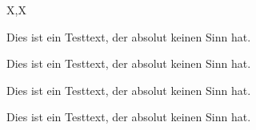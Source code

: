 \documentclass[a3paper,scifiposter,style=scifi]{tubsposter}
\begin{document}
\begin{tubsposter}{X,X}
  \begin{posterrow}[5cm,X]
    \begin{postercol}
      Dies ist ein Testtext, der absolut keinen Sinn hat.
    \end{postercol}
    \begin{postercol}
      Dies ist ein Testtext, der absolut keinen Sinn hat.
    \end{postercol}
  \end{posterrow}
  \begin{posterrow}[5cm,X]
    \begin{postercol}
      Dies ist ein Testtext, der absolut keinen Sinn hat.
    \end{postercol}
    \begin{postercol}
      Dies ist ein Testtext, der absolut keinen Sinn hat.
    \end{postercol}
  \end{posterrow}
\end{tubsposter}
\end{document}
